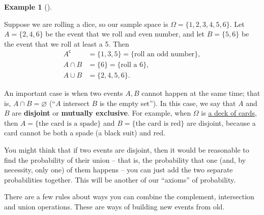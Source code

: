 \documentclass[
  letterpaper,
]{report}
\theoremstyle{definition}
\theoremstyle{definition}
\newtheorem{example}{Example}[chapter]
\theoremstyle{remark}
\begin{document}
\leavevmode{}%
\begin{example}[]\label{exm-dice-events}

Suppose we are rolling a dice, so our sample space is
\(\Omega = \{1,2,3,4,5,6\}\). Let \(A = \{2,4,6\}\) be the event that we
roll and even number, and let \(B = \{5,6\}\) be the event that we roll
at least a 5. Then \begin{align*}
A^\mathsf{c}&= \{1,3,5\} = \{\text{roll an odd number}\} ,\\
A \cap B &= \{6\} = \{\text{roll a 6}\} ,\\
A \cup B &= \{2,4,5,6\} .
\end{align*}

\end{example}

An important case is when two events \(A, B\) cannot happen at the same
time; that is, \(A \cap B = \varnothing\) (``\(A\) intersect \(B\) is
the empty set''). In this case, we say that \(A\) and \(B\) are
\textbf{disjoint} or \textbf{mutually exclusive}. For example, when
\(\Omega\) is
\href{https://en.wikipedia.org/wiki/Standard_52-card_deck}{a deck of
cards}, then \(A = \{\text{the card is a spade}\}\) and
\(B = \{\text{the card is red}\}\) are disjoint, because a card cannot
be both a spade (a black suit) and red.

You might think that if two events are disjoint, then it would be
reasonable to find the probability of their union -- that is, the
probability that one (and, by necessity, only one) of them happens --
you can just add the two separate probabilities together. This will be
another of our ``axioms'' of probability.

There are a few rules about ways you can combine the complement,
intersection and union operations. These are ways of building new events
from old.
\end{document}
